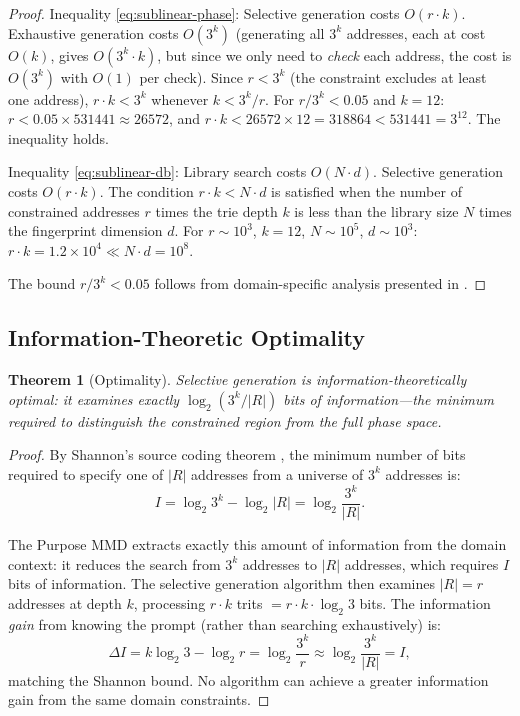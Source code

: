 \documentclass[11pt,twocolumn,a4paper]{article}
\newtheorem{theorem}{Theorem}[section]
\theoremstyle{definition}
\theoremstyle{remark}
\begin{document}
\begin{proof}
Inequality \eqref{eq:sublinear-phase}: Selective generation costs $O(r \cdot k)$. Exhaustive generation costs $O(3^k)$ (generating all $3^k$ addresses, each at cost $O(k)$, gives $O(3^k \cdot k)$, but since we only need to \emph{check} each address, the cost is $O(3^k)$ with $O(1)$ per check). Since $r < 3^k$ (the constraint excludes at least one address), $r \cdot k < 3^k$ whenever $k < 3^k / r$. For $r / 3^k < 0.05$ and $k = 12$: $r < 0.05 \times 531441 \approx 26572$, and $r \cdot k < 26572 \times 12 = 318864 < 531441 = 3^{12}$. The inequality holds.

Inequality \eqref{eq:sublinear-db}: Library search costs $O(N \cdot d)$. Selective generation costs $O(r \cdot k)$. The condition $r \cdot k < N \cdot d$ is satisfied when the number of constrained addresses $r$ times the trie depth $k$ is less than the library size $N$ times the fingerprint dimension $d$. For $r \sim 10^3$, $k = 12$, $N \sim 10^5$, $d \sim 10^3$: $r \cdot k = 1.2 \times 10^4 \ll N \cdot d = 10^8$.

The bound $r / 3^k < 0.05$ follows from domain-specific analysis presented in .
\end{proof}

\subsection{Information-Theoretic Optimality}\label{sec:optimality}

\begin{theorem}[Optimality]\label{thm:optimality}
Selective generation is information-theoretically optimal: it examines exactly $\log_2(3^k / |R|)$ bits of information---the minimum required to distinguish the constrained region from the full phase space.
\end{theorem}

\begin{proof}
By Shannon's source coding theorem \citep{shannon1948,cover2006}, the minimum number of bits required to specify one of $|R|$ addresses from a universe of $3^k$ addresses is:
\begin{equation}
  I = \log_2 3^k - \log_2 |R| = \log_2 \frac{3^k}{|R|}.
\end{equation}

The Purpose MMD extracts exactly this amount of information from the domain context: it reduces the search from $3^k$ addresses to $|R|$ addresses, which requires $I$ bits of information. The selective generation algorithm then examines $|R| = r$ addresses at depth $k$, processing $r \cdot k$ trits $= r \cdot k \cdot \log_2 3$ bits. The information \emph{gain} from knowing the prompt (rather than searching exhaustively) is:
\begin{equation}
  \Delta I = k \log_2 3 - \log_2 r = \log_2 \frac{3^k}{r} \approx \log_2 \frac{3^k}{|R|} = I,
\end{equation}
matching the Shannon bound. No algorithm can achieve a greater information gain from the same domain constraints.
\end{proof}
\end{document}

